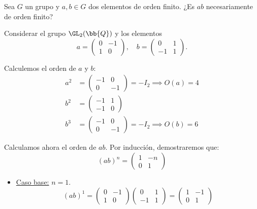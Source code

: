 \begin{ejercicio}\label{ej:3.7}
    Sea $G$ un grupo y $a, b \in G$ dos elementos de orden finito. ¿Es $ab$ necesariamente de orden finito?
    \begin{observacion}
        Considerar el grupo $\GL_2(\bb{Q})$ y los elementos
        \[
            a = \begin{pmatrix}
                0 & -1 \\
                1 & 0
            \end{pmatrix}, \quad b = \begin{pmatrix}
                0 & 1 \\
                -1 & 1
            \end{pmatrix}.
        \]
    \end{observacion}
    Calculemos el orden de $a$ y $b$:
    \begin{align*}
        a^2&=\begin{pmatrix}
            -1 & 0 \\
            0 & -1
        \end{pmatrix}=-I_2\implies O(a)=4\\
        b^2&=\begin{pmatrix}
            -1 & 1 \\
            -1 & 0
        \end{pmatrix}\\
        b^3&=\begin{pmatrix}
            -1 & 0 \\
            0 & -1
        \end{pmatrix}=-I_2\implies O(b)=6
    \end{align*}

    Calculamos ahora el orden de $ab$. Por inducción, demostraremos que:
    \begin{equation*}
        (ab)^n=\begin{pmatrix}
            1 & -n \\
            0 & 1
        \end{pmatrix}
    \end{equation*}
    \begin{itemize}
        \item \ul{Caso base:} $n=1$.
        \begin{equation*}
            (ab)^1=\begin{pmatrix}
                0 & -1 \\
                1 & 0
            \end{pmatrix}\begin{pmatrix}
                0 & 1 \\
                -1 & 1
            \end{pmatrix}=\begin{pmatrix}
                1 & -1 \\
                0 & 1
            \end{pmatrix}
        \end{equation*}


\end{itemize}
\end{ejercicio}
